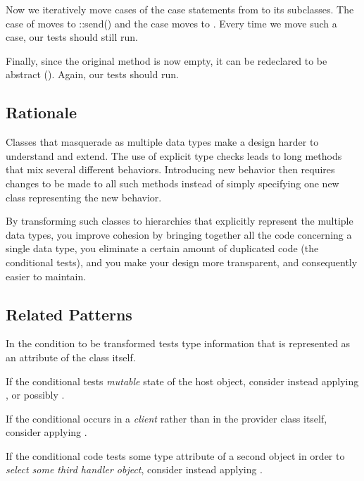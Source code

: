 \documentclass[a4paper,10pt,twoside]{book}
\begin{document}
Now we iteratively move cases of the case statements from  to its subclasses. The  case of  moves to ::send() and the  case moves to . Every time we move such a case, our tests should still run.

Finally, since the original  method is now empty, it can be redeclared to be abstract (\ie {}). Again, our tests should run. 

\subsection*{Rationale}

Classes that masquerade as multiple data types make a design harder to understand and extend. The use of explicit type checks leads to long methods that mix several different behaviors. Introducing new behavior then requires changes to be made to all such methods instead of simply specifying one new class representing the new behavior.

By transforming such classes to hierarchies that explicitly represent the multiple data types, you improve cohesion by bringing together all the code concerning a single data type, you eliminate a certain amount of duplicated code (\ie the conditional tests), and you make your design more transparent, and consequently easier to maintain.

\subsection*{Related Patterns}

In  the condition to be transformed tests type information that is represented as an attribute of the class itself.

If the conditional tests \emph{mutable} state of the host object, consider instead applying , or possibly .

If the conditional occurs in a \emph{client} rather than in the provider class itself, consider applying .

If the conditional code tests some type attribute of a second object in order to \emph{select some third handler object}, consider instead applying . 
\end{document}
